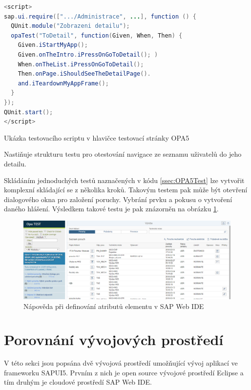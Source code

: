 \documentclass[thesis=M,czech]{FITthesis}[2012/06/26]
\begin{document}
\begin{algorithm}[H]
	\begin{lstlisting}[language=java]   
<script>
sap.ui.require([".../Administrace", ...], function () {
  QUnit.module("Zobrazeni detailu");
  opaTest("ToDetail", function(Given, When, Then) {
    Given.iStartMyApp();
    Given.onTheIntro.iPressOnGoToDetail(); )
    When.onTheList.iPressOnGoToDetail();
    Then.onPage.iShouldSeeTheDetailPage().
    and.iTeardownMyAppFrame();
  }
});
QUnit.start();
</script>
	\end{lstlisting}
	\caption{Ukázka testovacího scriptu v hlavičce testovací stránky OPA5}	
	\label{code:OPA5Test}
	\small Nastiňuje strukturu testu pro otestování navigace ze seznamu uživatelů do jeho detailu. 
\end{algorithm}
Skládáním jednoduchých testů naznačených v kódu \ref{ssec:OPA5Test} lze vytvořit komplexní skládající se z několika kroků. Takovým testem pak může být otevření dialogového okna pro založení poruchy. Vybrání prvku a pokusu o vytvoření daného hlášení. Výsledkem takové testu je pak znázorněn na obrázku \ref{img:opa5}.
\begin{figure}[H]
	\centering
	\includegraphics[width=1\textwidth]{images/opa5}
	\caption{Nápověda při definování atributů elementu v SAP Web IDE}
	\label{img:opa5}
\end{figure}

\section{Porovnání vývojových prostředí}
V této sekci jsou popsána dvě vývojová prostředí umožňující vývoj aplikací ve frameworku SAPUI5. Prvním z nich je open source vývojové prostředí Eclipse a tím druhým je cloudové prostředí SAP Web IDE.  
\end{document}
